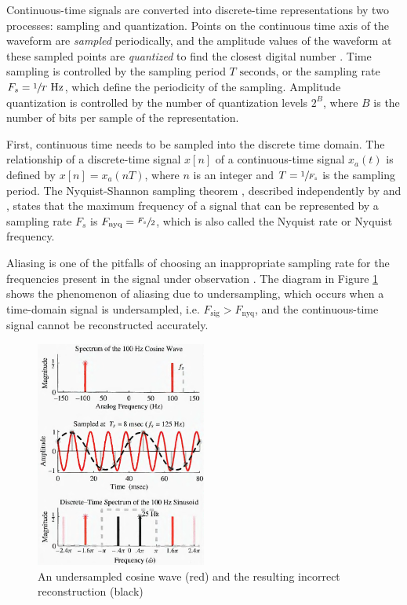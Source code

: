 \documentclass[report.tex]{subfiles}
\begin{document}
Continuous-time signals are converted into discrete-time representations by two processes: sampling and quantization. Points on the continuous time axis of the waveform are \textit{sampled} periodically, and the amplitude values of the waveform at these sampled points are \textit{quantized} to find the closest digital number \parencite{melbook}. Time sampling is controlled by the sampling period $T \text{ seconds}$, or the sampling rate $F_{s} = \sfrac{1}{T} \text{ Hz}$, which define the periodicity of the sampling. Amplitude quantization is controlled by the number of quantization levels $2^{B}$, where $B$ is the number of bits per sample of the representation.

First, continuous time needs to be sampled into the discrete time domain. The relationship of a discrete-time signal $x[n]$ of a continuous-time signal $x_{a}(t)$ is defined by $x[n] = x_{a}(nT)$, where $n$ is an integer and $T = \sfrac{1}{F_{s}}$ is the sampling period. The Nyquist-Shannon sampling theorem \parencite{discretebook}, described independently by \textcite{nyquist1928} and \textcite{shannon1948}, states that the maximum frequency of a signal that can be represented by a sampling rate $F_{s}$ is $F_{\text{nyq}} = \sfrac{F_{s}}{2}$, which is also called the Nyquist rate or Nyquist frequency.

Aliasing is one of the pitfalls of choosing an inappropriate sampling rate for the frequencies present in the signal under observation \parencite{dspfirst}. The diagram in Figure \ref{fig:aliasing} shows the phenomenon of aliasing due to undersampling, which occurs when a time-domain signal is undersampled, i.e. $F_{\text{sig}} > F_{\text{nyq}}$, and the continuous-time signal cannot be reconstructed accurately.

\begin{figure}[ht]
	\centering
	\includegraphics[width=0.5\textwidth]{./images-tftheory/aliasing_undersampling.png}
	\caption{An undersampled cosine wave (red) and the resulting incorrect reconstruction (black) \parencite[82]{dspfirst}}
	\label{fig:aliasing}
\end{figure}
\end{document}
